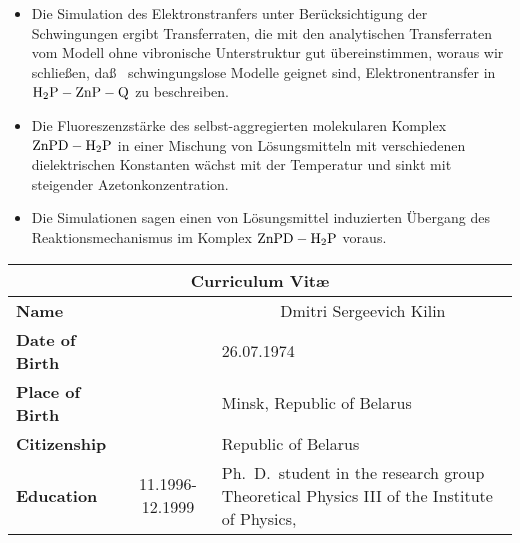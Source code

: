 \documentclass[12pt,twoside,a4paper]{report}
\begin{document}
{\begin{itemize}
\item
Die Simulation des Elektronstranfers 
unter 
Ber\"ucksichtigung der Schwingungen
ergibt  Transferraten, 
die mit den analytischen Transferraten 
vom
Modell ohne vibro\-nische Unterstruktur
gut \"ubereinstimmen,
woraus wir schlie\ss en,
da\ss~   schwingungslose Modelle 
geignet sind,
Elektronentransfer in ${\rm H_2P-ZnP-Q}$ zu beschreiben.




\item
Die Fluoreszenzst\"arke des
selbst-aggregierten molekularen Komplex ${\rm ZnPD-H_2P}$ 
in einer Mischung von L\"osungsmitteln mit verschiedenen
dielektrischen 
Konstanten
w\"achst mit
         der Temperatur 
und 
sinkt mit 
         steigender Azetonkonzentration.

\item
Die Simulationen sagen einen von  L\"osungsmittel induzierten 
\"Ubergang des Reaktionsmechanismus 
im Komplex ${\rm ZnPD-H_2P}$
voraus.
\end{itemize}
% 
%
\newpage
\baselineskip1cm  
\pagestyle{empty}  
\parindent6mm 
\oddsidemargin -1.0cm 
\evensidemargin -1.0cm 
\noindent
\begin{tabular}{|l||cp{10cm}|}
\hline
\multicolumn{3}{|c|}{\sc Curriculum Vit\ae}\\
\hline 
\hline
\multicolumn{1}{|l||}{\bf Name}                   &                        & \multicolumn{1}{c|}{Dmitri Sergeevich Kilin   }             \\  \hline
                      {\bf Date of Birth}         &                        & 26.07.1974                                                 \\  \hline
                      {\bf Place of Birth}        &                        & Minsk, Republic of Belarus                                         \\  \hline
                      {\bf Citizenship}           &                        &Republic of Belarus                                      \\  \hline
                      {\bf Education}             & 11.1996-12.1999  & Ph.~D.~student 
                                                                       in the research group Theoretical Physics III of the Institute of Physics, 

\end{tabular}}
\end{document}
